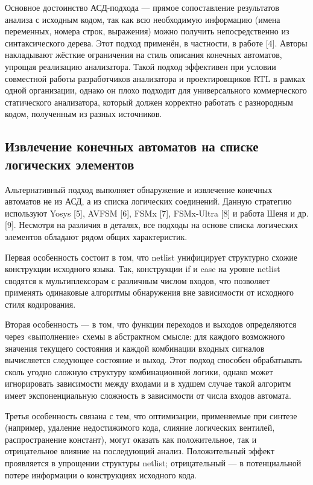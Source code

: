 Основное достоинство АСД-подхода --- прямое сопоставление результатов анализа с исходным кодом,
так как всю необходимую информацию (имена переменных, номера строк, выражения) можно получить
непосредственно из синтаксического дерева. Этот подход применён, в частности, в работе [4].
Авторы накладывают жёсткие ограничения на стиль описания конечных автоматов, упрощая реализацию
анализатора. Такой подход эффективен при условии совместной работы разработчиков анализатора и
проектировщиков RTL в рамках одной организации, однако он плохо подходит для универсального
коммерческого статического анализатора, который должен корректно работать с разнородным кодом,
полученным из разных источников.

\subsection{Извлечение конечных автоматов на списке логических элементов}
\label{subsec:Chapter2-Netlist}

Альтернативный подход выполняет обнаружение и извлечение конечных автоматов не из АСД,
а из списка логических соединений. Данную стратегию используют Yosys [5], AVFSM [6], FSMx [7],
FSMx-Ultra [8] и работа Шеня и др. [9]. Несмотря на различия в деталях, все подходы
на основе списка логических элементов обладают рядом общих характеристик.

Первая особенность состоит в том, что netlist унифицирует структурно схожие конструкции
исходного языка. Так, конструкции if и case на уровне netlist сводятся к мультиплексорам с
различным числом входов, что позволяет применять одинаковые алгоритмы обнаружения вне зависимости
от исходного стиля кодирования.

Вторая особенность — в том, что функции переходов и выходов определяются через «выполнение»
схемы в абстрактном смысле: для каждого возможного значения текущего состояния и каждой
комбинации входных сигналов вычисляется следующее состояние и выход. Этот подход способен
обрабатывать сколь угодно сложную структуру комбинационной логики, однако может игнорировать
зависимости между входами и в худшем случае такой алгоритм имеет экспоненциальную
сложность в зависимости от числа входов автомата.

Третья особенность связана с тем, что оптимизации, применяемые при синтезе
(например, удаление недостижимого кода, слияние логических вентилей, распространение констант),
могут оказать как положительное, так и отрицательное влияние на последующий анализ.
Положительный эффект проявляется в упрощении структуры netlist;
отрицательный — в потенциальной потере информации о конструкциях исходного кода.

